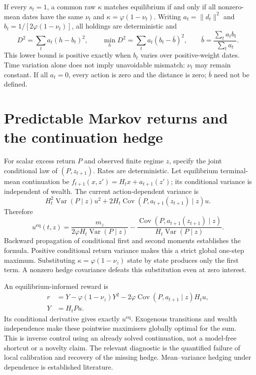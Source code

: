 \documentclass[11pt,a4paper]{article}
\theoremstyle{plain}
\theoremstyle{definition}
\theoremstyle{remark}
\newcommand{\Var}{\operatorname{Var}}
\begin{document}
If every $s_t=1$, a common raw $\kappa$ matches equilibrium if and only if all
nonzero-mean dates have the same $\nu_t$ and $\kappa=\varphi(1-\nu_t)$.
Writing $a_t=\|d_t\|^2$ and $b_t=1/[2\varphi(1-\nu_t)]$, all holdings are
deterministic and
\[
 D^2=\sum_ta_t(h-b_t)^2,\qquad
 \min_hD^2=\sum_ta_t(b_t-\bar b)^2,\qquad
 \bar b=\frac{\sum_ta_tb_t}{\sum_ta_t}.
\]
This lower bound is positive exactly when $b_t$ varies over positive-weight
dates. Time variation alone does not imply unavoidable mismatch: $\nu_t$ may
remain constant. If all $a_t=0$, every action is zero and the distance is zero;
$\bar b$ need not be defined.

\ifdim\dimexpr\pagegoal-\pagetotal\relax<120pt\newpage\fi
\section{Predictable Markov returns and the continuation hedge}
\label{app:dependence}
For scalar excess return $P$ and observed finite regime $z$, specify the joint
conditional law of $(P,z_{t+1})$. Rates are deterministic. Let equilibrium
terminal-mean continuation be
$f_{t+1}(x,z')=H_tx+a_{t+1}(z')$; its conditional variance is independent of wealth.
The current action-dependent variance is
\[
 H_t^2\Var(P\mid z)u^2
 +2H_t\operatorname{Cov}(P,a_{t+1}(z_{t+1})\mid z)u.
\]
Therefore
\begin{equation}
 u^{\mathrm{eq}}(t,z)=\frac{m_z}{2\varphi H_t\Var(P\mid z)}
 -\frac{\operatorname{Cov}(P,a_{t+1}(z_{t+1})\mid z)}{H_t\Var(P\mid z)}.
\end{equation}
Backward propagation of conditional first and second moments establishes the
formula. Positive conditional return variance makes this a strict global
one-step maximum. Substituting $\kappa=\varphi(1-\nu_z)$ state by state produces
only the first term. A nonzero hedge covariance defeats this substitution even
at zero interest.

An equilibrium-informed reward is
\begin{align}
 r&=Y-\varphi(1-\nu_z)Y^2
       -2\varphi\operatorname{Cov}(P,a_{t+1}\mid z)H_tu,\\
 Y&=H_tPu.
\end{align}
Its conditional derivative gives exactly $u^{\mathrm{eq}}$. Exogenous
transitions and wealth independence make these pointwise maximisers globally
optimal for the sum. This is inverse control using an already solved
continuation, not a model-free shortcut or a novelty claim. The relevant
diagnostic is the quantified failure of local calibration and recovery of the
missing hedge. Mean--variance hedging under dependence is established literature.
\end{document}
